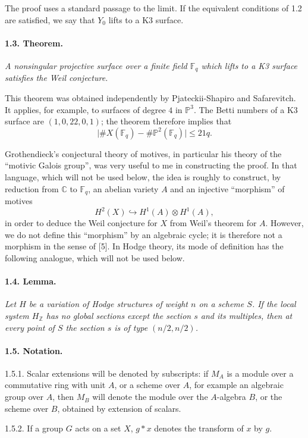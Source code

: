 \documentclass[10pt]{article}
\newcommand{\C}{\mathbb{C}}
\newcommand{\Z}{\mathbb{Z}}
\newcommand{\Fp}{\mathbb{F}_q}
\newcommand{\into}{\hookrightarrow}
\begin{document}
The proof uses a standard passage to the limit. If the equivalent conditions of 1.2 are satisfied, we say that $Y_0$ lifts to a K3 surface.

\paragraph{1.3. Theorem.} \emph{A nonsingular projective surface over a finite field $\Fp$ which lifts to a K3 surface satisfies the Weil conjecture.}

This theorem was obtained independently by Pjateckii-Shapiro and Safarevitch. It applies, for example, to surfaces of degree $4$ in $\mathbb P^3$. The Betti numbers of a K3 surface are $(1,0,22,0,1)$; the theorem therefore implies that
\[
\bigl|\#X(\Fp)-\#\mathbb P^2(\Fp)\bigr|\le21q.
\]

Grothendieck's conjectural theory of motives, in particular his theory of the ``motivic Galois group'', was very useful to me in constructing the proof. In that language, which will not be used below, the idea is roughly to construct, by reduction from $\C$ to $\Fp$, an abelian variety $A$ and an injective ``morphism'' of motives
\[
H^2(X)\into H^1(A)\otimes H^1(A),
\]
in order to deduce the Weil conjecture for $X$ from Weil's theorem for $A$. However, we do not define this ``morphism'' by an algebraic cycle; it is therefore not a morphism in the sense of [5]. In Hodge theory, its mode of definition has the following analogue, which will not be used below.

\paragraph{1.4. Lemma.} \emph{Let $H$ be a variation of Hodge structures of weight $n$ on a scheme $S$. If the local system $H_\Z$ has no global sections except the section $s$ and its multiples, then at every point of $S$ the section $s$ is of type $(n/2,n/2)$.}

\paragraph{1.5. Notation.} 1.5.1. Scalar extensions will be denoted by subscripts: if $M_A$ is a module over a commutative ring with unit $A$, or a scheme over $A$, for example an algebraic group over $A$, then $M_B$ will denote the module over the $A$-algebra $B$, or the scheme over $B$, obtained by extension of scalars.

1.5.2. If a group $G$ acts on a set $X$, $g*x$ denotes the transform of $x$ by $g$.
\end{document}
